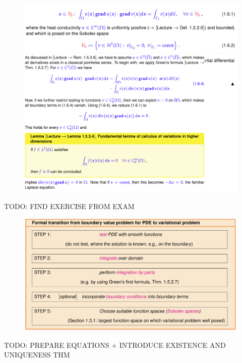 \begin{figure}
\centering
    \includegraphics{week02/ex1_6_1.png}
    \includegraphics{week02/ex1_6_sol.png}
\end{figure}


TODO: FIND EXERCISE FROM EXAM

\begin{figure}
\centering
\includegraphics[]{week02/pde_to_lvp_1.png}
\end{figure}



TODO: PREPARE EQUATIONS + INTRODUCE EXISTENCE AND UNIQUENESS THM

